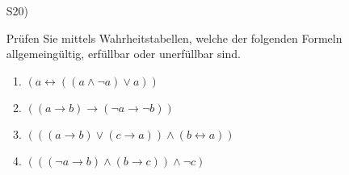 \begin{exercise}
  \label{logic:truth-table-2}
  \begin{enumerate}
  	\item [S20)]
  
  Prüfen Sie mittels Wahrheitstabellen, welche der folgenden Formeln
  allgemeingültig, erfüllbar oder unerfüllbar sind.
 \begin{enumerate}[label={\alph*)}]
 \item $(a \leftrightarrow ((a \wedge \neg a) \vee a))$
 \item $((a \rightarrow b) \rightarrow (\neg a \rightarrow \neg b))$
 \item $(((a \rightarrow b) \vee (c \rightarrow a)) \wedge (b \leftrightarrow a))$
 \item $(((\neg a \rightarrow b) \wedge (b \rightarrow c)) \wedge \neg c)$
 \end{enumerate}
 \end{enumerate}
\end{exercise}

